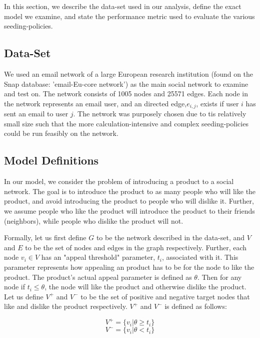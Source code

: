 In this section, we describe the data-set used in our analysis, define the exact model we examine, and state the performance metric used to evaluate the various seeding-policies. 

\subsection{Data-Set}

We used an email network of a large European research institution (found on the Snap database: 'email-Eu-core network') as the main social network to examine and test on. The network consists of 1005 nodes and 25571 edges. Each node in the network represents an email user, and an directed  edge,$e_{i,j}$,  exists if user $i$ has sent an email to user $j$. The network was purposely chosen due to tis relatively small size such that the more calculation-intensive and complex seeding-policies could be run feasibly on the network.

\subsection{Model Definitions}

In our model, we consider the problem of introducing a product to a social network. The goal is to introduce the product to as many people who will like the product, and avoid introducing the product to people who will dislike it. Further, we assume people who like the product will introduce the product to their friends (neighbors), while people who dislike the product will not.

Formally, let us first define $G$ to be the network described in the data-set, and $V$ and $E$ to be the set of nodes and edges in the graph respectively. Further, each node $v_i \in V$ has an "appeal threshold" parameter, $t_i$, associated with it. This parameter represents how appealing an product has to be for the node to like the product. The product's actual appeal parameter is defined as $\theta$. Then for any node if $t_i \le \theta$, the node will like the product and otherwise dislike the product. Let us define $V^+$ and $V^-$ to be the set of positive and negative target nodes that like and dislike the product respectively. $V^+$ and $V^-$ is defined as follows:

\begin{equation}
    V^+= \{ v_i | \theta \ge t_i\}
\end{equation} 
\begin{equation}
    V^-= \{ v_i | \theta < t_i\}
\end{equation} 

